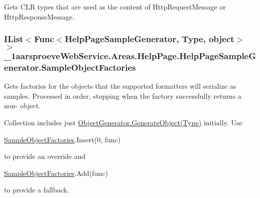 Gets C\+L\+R types that are used as the content of Http\+Request\+Message or Http\+Response\+Message. 

\hypertarget{class__1aarsproeve_web_service_1_1_areas_1_1_help_page_1_1_help_page_sample_generator_a29295b515e45cebc44d8a111e9dd3d01}{}
\subsubsection[{Sample\+Object\+Factories}]{\setlength{\rightskip}{0pt plus 5cm}I\+List$<$Func$<${\bf Help\+Page\+Sample\+Generator}, Type, object$>$ $>$ \+\_\+1aarsproeve\+Web\+Service.\+Areas.\+Help\+Page.\+Help\+Page\+Sample\+Generator.\+Sample\+Object\+Factories\hspace{0.3cm}{\ttfamily [get]}}\label{class__1aarsproeve_web_service_1_1_areas_1_1_help_page_1_1_help_page_sample_generator_a29295b515e45cebc44d8a111e9dd3d01}


Gets factories for the objects that the supported formatters will serialize as samples. Processed in order, stopping when the factory successfully returns a non-\/ object. 

Collection includes just \hyperlink{class__1aarsproeve_web_service_1_1_areas_1_1_help_page_1_1_object_generator_ad47fd6b8894401475144cf522d8767d0}{Object\+Generator.\+Generate\+Object(\+Type)} initially. Use 
\begin{DoxyCode}
\hyperlink{class__1aarsproeve_web_service_1_1_areas_1_1_help_page_1_1_help_page_sample_generator_a29295b515e45cebc44d8a111e9dd3d01}{SampleObjectFactories}.Insert(0, func)
\end{DoxyCode}
 to provide an override and 
\begin{DoxyCode}
\hyperlink{class__1aarsproeve_web_service_1_1_areas_1_1_help_page_1_1_help_page_sample_generator_a29295b515e45cebc44d8a111e9dd3d01}{SampleObjectFactories}.Add(func)
\end{DoxyCode}
 to provide a fallback.\hypertarget{class__1aarsproeve_web_service_1_1_areas_1_1_help_page_1_1_help_page_sample_generator_aa9621fc1bc0621b656579d3967528dcc}{}
